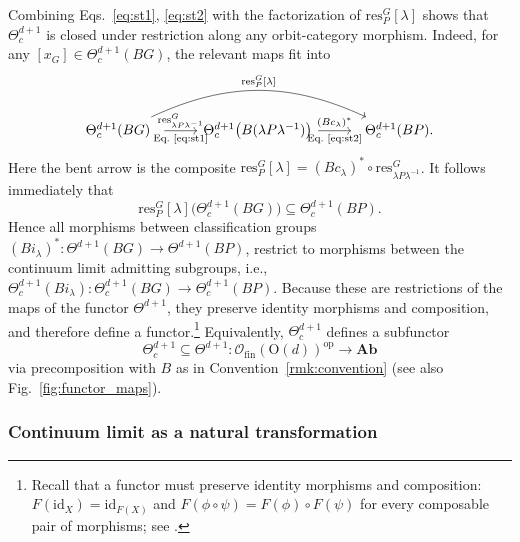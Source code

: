 \documentclass[aps,prx,reprint,superscriptaddress,twocolumn,amsmath,amssymb,amsfonts, nofootinbib]{revtex4-2}
\newcommand{\ofin}{\mathcal{O}_{\text{fin}}}
\newcommand{\res}{\text{res}}
\newcommand{\catname}[1]{{\textbf{#1}}}
\newcommand{\Ab}{\catname{Ab}}
\theoremstyle{apsstyle}
\begin{document}
Combining Eqs.~\ref{eq:st1}, \ref{eq:st2} with the factorization of $\res^{G}_{P}[\lambda ]$ shows that $\Theta^{d+1}_{c}$ is closed under restriction along any orbit-category morphism. Indeed, for any $[x_G]\in \Theta^{d+1}_{c}(BG)$, the relevant maps fit into
\begin{equation*}
\begin{tikzcd}
\Theta^{d+1}_{c}(BG)\;\;
\arrow[r, "\res^{G}_{\lambda P\lambda^{-1}}",  "\text{Eq.~\eqref{eq:st1}}"']
\arrow[rr, bend left=25, "\res^{G}_{P}\text{[}\lambda\text{]}"]
&\Theta^{d+1}_{c}\bigl(B(\lambda P\lambda^{-1})\bigr)
\arrow[r, "(Bc_{\lambda})^{*}", "\text{Eq.~\eqref{eq:st2}}"']
&\;\;\Theta^{d+1}_{c}(BP).
\end{tikzcd}
\end{equation*}
Here the bent arrow is the composite $\res^{G}_{P}[\lambda]= (Bc_{\lambda})^{*} \circ \res^{G}_{\lambda P\lambda^{-1}}$. It follows immediately that
\begin{equation}
\label{eq:subfunctor_prop}
    \res^{G}_{P}[\lambda ]\bigl(\Theta^{d+1}_{c}(BG)\bigr)\subseteq \Theta^{d+1}_{c}(BP).
\end{equation}
Hence all morphisms
between classification groups $(Bi_{\lambda })^{*}: \Theta^{d+1}(BG) \to \Theta^{d+1}(BP)$, restrict to morphisms between the continuum limit admitting subgroups, i.e., $\Theta^{d+1}_{c}(Bi_{\lambda }): \Theta^{d+1}_{c}(BG) \to \Theta^{d+1}_{c}(BP)$.
Because these are restrictions of the maps of the functor $\Theta^{d+1}$, they preserve identity morphisms and composition, and therefore define a functor.\footnote{Recall that a functor must preserve
identity morphisms and composition: $F(\mathrm{id}_X)=\mathrm{id}_{F(X)}$ and
$F(\phi\circ\psi)=F(\phi)\circ F(\psi)$ for every composable pair of
morphisms; see \cite[Tag 0013]{stacks-project}.} Equivalently, $\Theta^{d+1}_{c}$ defines a subfunctor 
\begin{equation}
\label{eq:theta_c}
\Theta^{d+1}_{c}\subseteq \Theta^{d+1}:\ofin(\mathrm{O}(d))^{\mathrm{op}}\to\Ab
\end{equation}
via precomposition with $B$ as in Convention~\ref{rmk:convention} (see also Fig.~\ref{fig:functor_maps}).


\subsubsection{Continuum limit as a natural transformation}
\label{sec:natural_transformation}
\end{document}

